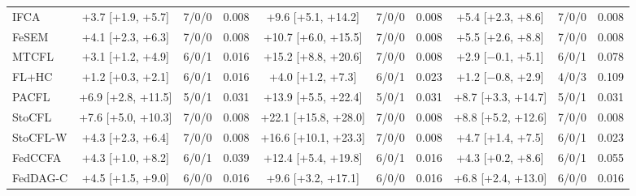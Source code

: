 {\begin{tabular}{l c c c c c c c c c}
IFCA & +3.7 [+1.9, +5.7] & 7/0/0 & 0.008 & +9.6 [+5.1, +14.2] & 7/0/0 & 0.008 & +5.4 [+2.3, +8.6] & 7/0/0 & 0.008 \\
FeSEM & +4.1 [+2.3, +6.3] & 7/0/0 & 0.008 & +10.7 [+6.0, +15.5] & 7/0/0 & 0.008 & +5.5 [+2.6, +8.8] & 7/0/0 & 0.008 \\
MTCFL & +3.1 [+1.2, +4.9] & 6/0/1 & 0.016 & +15.2 [+8.8, +20.6] & 7/0/0 & 0.008 & +2.9 [$-$0.1, +5.1] & 6/0/1 & 0.078 \\
FL+HC & +1.2 [+0.3, +2.1] & 6/0/1 & 0.016 & +4.0 [+1.2, +7.3] & 6/0/1 & 0.023 & +1.2 [$-$0.8, +2.9] & 4/0/3 & 0.109 \\
PACFL & +6.9 [+2.8, +11.5] & 5/0/1 & 0.031 & +13.9 [+5.5, +22.4] & 5/0/1 & 0.031 & +8.7 [+3.3, +14.7] & 5/0/1 & 0.031 \\
StoCFL & +7.6 [+5.0, +10.3] & 7/0/0 & 0.008 & +22.1 [+15.8, +28.0] & 7/0/0 & 0.008 & +8.8 [+5.2, +12.6] & 7/0/0 & 0.008 \\
StoCFL-W & +4.3 [+2.3, +6.4] & 7/0/0 & 0.008 & +16.6 [+10.1, +23.3] & 7/0/0 & 0.008 & +4.7 [+1.4, +7.5] & 6/0/1 & 0.023 \\
FedCCFA & +4.3 [+1.0, +8.2] & 6/0/1 & 0.039 & +12.4 [+5.4, +19.8] & 6/0/1 & 0.016 & +4.3 [+0.2, +8.6] & 6/0/1 & 0.055 \\
FedDAG-C & +4.5 [+1.5, +9.0] & 6/0/0 & 0.016 & +9.6 [+3.2, +17.1] & 6/0/0 & 0.016 & +6.8 [+2.4, +13.0] & 6/0/0 & 0.016 \\
\bottomrule
\end{tabular}
}
